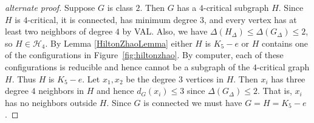 \documentclass[12pt]{article}
\theoremstyle{plain}
\theoremstyle{definition}
\theoremstyle{remark}
\newcommand{\fancy}[1]{\mathcal{#1}}
\def\H{\fancy{H}}
\begin{document}
\bigskip

\begin{proof}[alternate proof]
Suppose $G$ is class $2$.  Then $G$ has a $4$-critical subgraph $H$.   Since $H$ is $4$-critical, it is connected, has minimum degree $3$, and every vertex has at least two neighbors of degree $4$ by VAL.  Also, we have $\Delta(H_\Delta) \le \Delta(G_\Delta) \le 2$, so $H \in \H_4$.  By Lemma \ref{HiltonZhaoLemma} either $H$ is $K_5-e$ or $H$ contains one of the 
configurations in Figure~\ref{fig:hiltonzhao}.  By computer, each of these configurations is reducible and hence cannot be a subgraph of the $4$-critical graph $H$.  Thus $H$ is $K_5-e$.  Let $x_1,x_2$ be the degree $3$ vertices in $H$.  Then $x_i$ has three degree $4$ neighbors in $H$ and hence $d_G(x_i) \le 3$ since $\Delta(G_\Delta) \le 2$.  That is, $x_i$ has no neighbors outside $H$.  Since $G$ is connected we must have $G = H = K_5 - e$. 
\end{proof}
\end{document}
